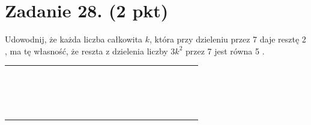 \documentclass[10pt]{article}
\begin{document}
\section*{Zadanie 28. (2 pkt)}
Udowodnij, że każda liczba całkowita \(k\), która przy dzieleniu przez 7 daje resztę 2 , ma tę własność, że reszta z dzielenia liczby \(3 k^{2}\) przez 7 jest równa 5 .

\begin{center}
\begin{tabular}{|c|c|c|c|c|c|c|c|c|c|c|c|c|c|c|c|c|c|c|c|c|c|c|}
\hline
 &  &  &  &  &  &  &  &  &  &  &  &  &  &  &  &  &  &  &  &  &  &  \\
\hline
 &  &  &  &  &  &  &  &  &  &  &  &  &  &  &  &  &  &  &  &  &  &  \\
\hline
 &  &  &  &  &  &  &  &  &  &  &  &  &  &  &  &  &  &  &  &  &  &  \\
\hline
 &  &  &  &  &  &  &  &  &  &  &  &  &  &  &  &  &  &  &  &  &  &  \\
\hline
 &  &  &  &  &  &  &  &  &  &  &  &  &  &  &  &  &  &  &  &  &  &  \\
\hline
 &  &  &  &  &  &  &  &  &  &  &  &  &  &  &  &  &  &  &  &  &  &  \\
\hline
 &  &  &  &  &  &  &  &  &  &  &  &  &  &  &  &  &  &  &  &  &  &  \\
\hline
 &  &  &  &  &  &  &  &  &  &  &  &  &  &  &  &  &  &  &  &  &  &  \\
\hline
 &  &  &  &  &  &  &  &  &  &  &  &  &  &  &  &  &  &  &  &  &  &  \\
\hline
 &  &  &  &  &  &  &  &  &  &  &  &  &  &  &  &  &  &  &  &  &  &  \\
\hline
 &  &  &  &  &  &  &  &  &  &  &  &  &  &  &  &  &  &  &  &  &  &  \\
\hline
 &  &  &  &  &  &  &  &  &  &  &  &  &  &  &  &  &  &  &  &  &  &  \\
\hline
 &  &  &  &  &  &  &  &  &  &  &  &  &  &  &  &  &  &  &  &  &  &  \\
\hline
 &  &  &  &  &  &  &  &  &  &  &  &  &  &  &  &  &  &  &  &  &  &  \\
\hline
 &  &  &  &  &  &  &  &  &  &  &  &  &  &  &  &  &  &  &  &  &  &  \\
\hline
 &  &  &  &  &  &  &  &  &  &  &  &  &  &  &  &  &  &  &  &  &  &  \\
\hline
 &  &  &  &  &  &  &  &  &  &  &  &  &  &  &  &  &  &  &  &  &  &  \\
\hline
 &  &  &  &  &  &  &  &  &  &  &  &  &  &  &  &  &  &  &  &  &  &  \\

\end{tabular}
\end{center}
\end{document}
